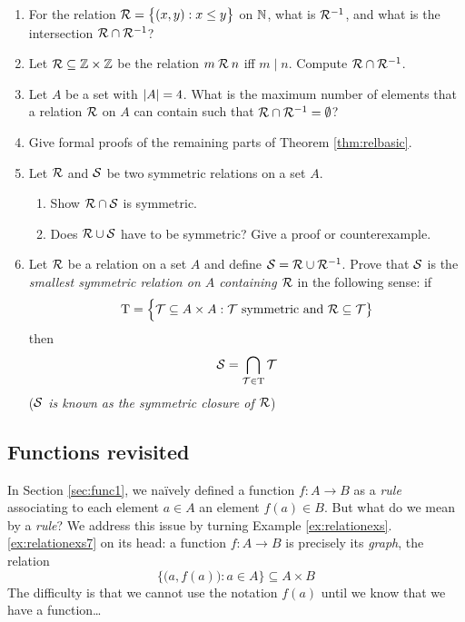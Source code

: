 \begin{exercises}{}{}
\begin{enumerate}
  
  \item For the relation $\mathcal{R}=\bigl\{(x,y):x\le y\bigr\}$ on $\mathbb{N}$, what is $\mathcal{R}^{-1}$, and what is the intersection $\mathcal{R}\cap\mathcal{R}^{-1}$?
	
	
	\item Let $\mathcal{R} \subseteq \mathbb{Z}\times\mathbb{Z}$ be the relation $m\mathbin{\mathcal{R}} n$ iff $m\mid n$. Compute $\mathcal{R}\cap\mathcal{R}^{-1}$.
  

  \item Let $A$ be a set with $\left| A\right|=4$. What is the maximum number of elements that a relation $\mathcal{R}$ on $A$ can contain such that $\mathcal{R}\cap \mathcal{R}^{-1}=\emptyset$?
   
  
  \item Give formal proofs of the remaining parts of Theorem \ref{thm:relbasic}.
  
    
  \item Let $\mathcal{R}$ and $\mathcal{S}$ be two symmetric relations on a set $A$. 
	\begin{enumerate}
    \item Show $\mathcal{R} \cap \mathcal{S}$ is symmetric.
    \item Does $\mathcal{R} \cup \mathcal{S}$ have to be symmetric? Give a proof or counterexample.
	\end{enumerate}
  
  
  \item Let $\mathcal{R}$ be a relation on a set $A$ and define $\mathcal{S}=\mathcal{R}\cup\mathcal{R}^{-1}$. Prove that $\mathcal{S}$ is the \emph{smallest symmetric relation on $A$ containing $\mathcal{R}$} in the following sense: if
  \[
  	\mathrm T=\Bigl\{\mathcal T\subseteq A\times A:\mathcal T\text{ symmetric and }\mathcal{R}\subseteq\mathcal T\bigr\}
  \]
  then
  \[
  	\mathcal{S}=\bigcap\limits_{\mathcal T\in \mathrm T} \mathcal T
  \]
  (\emph{$\mathcal{S}$ is known as the \emph{symmetric closure} of $\mathcal{R}$})
\end{enumerate}

\end{exercises}

\clearpage



\subsection{Functions revisited}\label{sec:func2}

In Section \ref{sec:func1}, we naïvely defined a function $f:A\to B$ as a \emph{rule} associating to each element $a\in A$ an element $f(a)\in B$. But what do we mean by a \emph{rule}? We address this issue by turning Example \ref*{ex:relationexs}.\ref{ex:relationexs7} on its head: a function $f:A\to B$ is precisely its \emph{graph}, the relation
\[
	\bigl\{\bigl(a,f(a)\bigr):a\in A\bigr\}\subseteq A\times B
\]
The difficulty is that we cannot use the notation $f(a)$ until we know that we have a function\ldots

